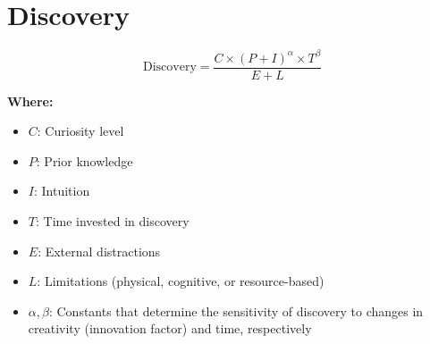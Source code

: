 \chapter{Discovery}

\begin{equation}
\text{Discovery} = \frac{C \times (P + I)^\alpha \times T^\beta}{E + L}
\end{equation}

\textbf{Where:}

\begin{itemize}
    \item $C$: Curiosity level
    \item $P$: Prior knowledge
    \item $I$: Intuition
    \item $T$: Time invested in discovery
    \item $E$: External distractions
    \item $L$: Limitations (physical, cognitive, or resource-based)
    \item $\alpha, \beta$: Constants that determine the sensitivity of discovery to changes in creativity (innovation factor) and time, respectively
\end{itemize}